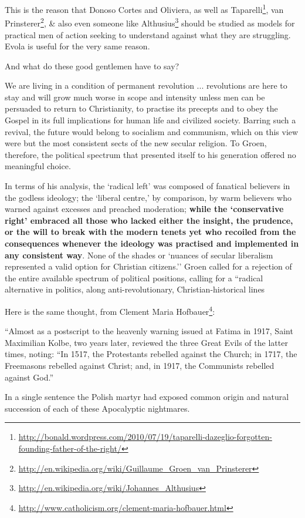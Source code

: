 This is the reason that Donoso Cortes and Oliviera, as well as Taparelli\footnote{\url{http://bonald.wordpress.com/2010/07/19/taparelli-dazeglio-forgotten-founding-father-of-the-right/}}, van Prinsterer\footnote{\url{http://en.wikipedia.org/wiki/Guillaume\_Groen\_van\_Prinsterer}}, \& also even someone like Althusius\footnote{\url{http://en.wikipedia.org/wiki/Johannes\_Althusius}} should be studied as models for practical men of action seeking to understand against what they are struggling. Evola is useful for the very same reason.

And what do these good gentlemen have to say?

\begin{quotationx}
We are living in a condition of permanent revolution ... revolutions are here to stay and will grow much worse in scope and intensity unless men can be persuaded to return to Christianity, to practise its precepts and to obey the Gospel in its full implications for human life and civilized society. Barring such a revival, the future would belong to socialism and communism, which on this view were but the most consistent sects of the new secular religion. To Groen, therefore, the political spectrum that presented itself to his generation offered no meaningful choice.

In terms of his analysis, the `radical left' was composed of fanatical believers in the godless ideology; the `liberal centre,' by comparison, by warm believers who warned against excesses and preached moderation; \textbf{while the `conservative right' embraced all those who lacked either the insight, the prudence, or the will to break with the modern tenets yet who recoiled from the consequences whenever the ideology was practised and implemented in any consistent way}. None of the shades or `nuances of secular liberalism represented a valid option for Christian citizens.'' Groen called for a rejection of the entire available spectrum of political positions, calling for a ``radical alternative in politics, along anti-revolutionary, Christian-historical lines 
\end{quotationx}


Here is the same thought, from Clement Maria Hofbauer\footnote{\url{http://www.catholicism.org/clement-maria-hofbauer.html}}:

\begin{quotex}
``Almost as a postscript to the heavenly warning issued at Fatima in 1917, Saint Maximilian Kolbe, two years later, reviewed the three Great Evils of the latter times, noting: ``In 1517, the Protestants rebelled against the Church; in 1717, the Freemasons rebelled against Christ; and, in 1917, the Communists rebelled against God.''

In a single sentence the Polish martyr had exposed common origin and natural succession of each of these Apocalyptic nightmares.
\end{quotex}


